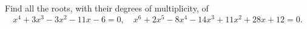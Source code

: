 Find all the roots, with their degrees of multiplicity, of
\[
x^{4} + 3x^{3} - 3x^{2} - 11x - 6 = 0,\quad
x^{6} + 2x^{5} - 8x^{4} - 14x^{3} + 11x^{2} + 28x + 12 = 0.
\]

